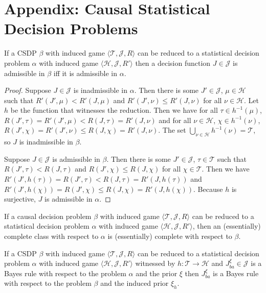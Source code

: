 \section{Appendix: Causal Statistical Decision Problems}\label{app:csdps}

\begin{lemma}\label{lem:red_adm_app}
If a CSDP $\beta$ with induced game $\langle \mathscr{T},\mathscr{J}, R\rangle$ can be reduced to a statistical decision problem $\alpha$ with induced game $\langle \mathscr{H},\mathscr{J},R' \rangle$ then a decision function $J\in \mathscr{J}$ is admissible in $\beta$ iff it is admissible in $\alpha$.
\end{lemma}

\begin{proof}
Suppose $J\in\mathscr{J}$ is inadmissible in $\alpha$. Then there is some $J'\in\mathscr{J}$, $\mu\in\mathscr{H}$ such that $R'(J',\mu)<R'(J,\mu)$ and $R'(J',\nu)\leq R'(J,\nu)$ for all $\nu\in \mathscr{H}$. Let $h$ be the function that witnesses the reduction. Then we have for all $\tau\in h^{-1}(\mu)$, $R(J',\tau)=R'(J',\mu)<R(J,\tau)=R'(J,\nu)$ and for all $\nu\in \mathscr{H}$, $\chi\in h^{-1}(\nu)$, $R(J',\chi)=R'(J',\nu)\leq R(J,\chi)=R'(J,\nu)$. The set $\bigcup_{\nu\in\mathscr{H}} h^{-1}(\nu)=\mathscr{T}$, so $J$ is inadmissible in $\beta$.

Suppose $J\in \mathscr{J}$ is admissible in $\beta$. Then there is some $J'\in\mathscr{J}$, $\tau\in\mathscr{T}$ such that $R(J',\tau)<R(J,\tau)$ and $R(J',\chi)\leq R(J,\chi)$ for all $\chi\in \mathscr{T}$. Then we have $R'(J',h(\tau))=R(J',\tau)<R(J,\tau)=R'(J,h(\tau))$ and $R'(J',h(\chi))=R(J',\chi)\leq R(J,\chi)=R'(J,h(\chi))$. Because $h$ is surjective, $J$ is admissible in $\alpha$.
\end{proof}

\begin{corollary}\label{cor:red_comp}
If a causal decision problem $\beta$ with induced game $\langle \mathscr{T},\mathscr{J}, R\rangle$ can be reduced to a statistical decision problem $\alpha$ with induced game $\langle \mathscr{H},\mathscr{J},R' \rangle$, then an (essentially) complete class with respect to $\alpha$ is (essentially) complete with respect to $\beta$.
\end{corollary}

\begin{lemma}\label{lem:IB_rule}
If a CSDP $\beta$ with induced game $\langle \mathscr{T},\mathscr{J}, R\rangle$ can be reduced to a statistical decision problem $\alpha$ with induced game $\langle \mathscr{H},\mathscr{J},R' \rangle$ witnessed by $h:\mathscr{T}\to\mathscr{H}$ and $J_{ba}^\xi\in \mathscr{J}$ is a Bayes rule with respect to the problem $\alpha$ and the prior $\xi$ then $J_{ba}^\xi$ is a Bayes rule with respect to the problem $\beta$ and the induced prior $\xi_h$.
\end{lemma}

